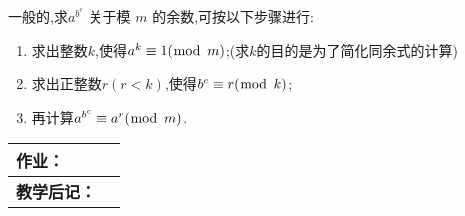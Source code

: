 \entry 一般的,求$a^{b^{c}}$ 关于模 $m$ 的余数,可按以下步骤进行:
\begin{enumerate}[itemindent=2em]
	\item[\ding{172}] 求出整数$k$,使得$a^{k} \equiv 1(\bmod\hspace{1ex} m)$;(求$k$的目的是为了简化同余式的计算)
	\item[\ding{173}] 求出正整数$r(r<k)$,使得$b^{c} \equiv r(\bmod \hspace{1ex}k)$;
	\item[\ding{174}] 再计算$a^{b^{c}} \equiv a^{r}(\bmod \hspace{1ex}m)$.
\end{enumerate}

\begin{table}[htb]
	\centering  
	\begin{tabular}{p{22mm}|p{105.6mm}}
		\hline 
		\textbf{作业：}      &   \\ \hline
		\textbf{教学后记：}  & \vspace{4ex} \\ \hline
	\end{tabular}
\end{table}

